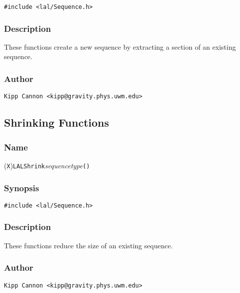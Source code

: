 \begin{verbatim}
#include <lal/Sequence.h>
\end{verbatim}


\subsubsection{Description}

These functions create a new sequence by extracting a section of an
existing sequence.

\subsubsection{Author}

\verb|Kipp Cannon <kipp@gravity.phys.uwm.edu>|


\subsection{Shrinking Functions}

\subsubsection{Name}

(\texttt{X})\texttt{LALShrink}\textit{sequencetype}\texttt{()}

\subsubsection{Synopsis}

\begin{verbatim}
#include <lal/Sequence.h>
\end{verbatim}


\subsubsection{Description}

These functions reduce the size of an existing sequence.

\subsubsection{Author}

\verb|Kipp Cannon <kipp@gravity.phys.uwm.edu>|
